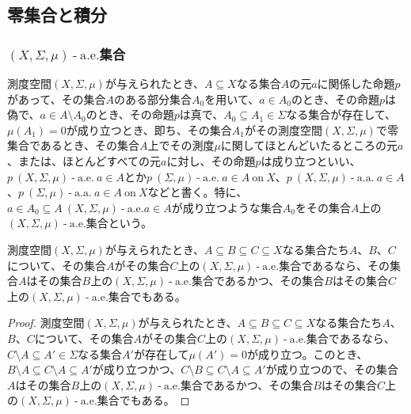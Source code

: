 \documentclass[dvipdfmx]{jsarticle}
\begin{document}
\subsection{零集合と積分}%
\subsubsection{$(X,\varSigma,\mu) \ \text{-} \ \mathrm{a.e.}$集合}%
\begin{dfn*}
測度空間$(X,\varSigma,\mu)$が与えられたとき、$A \subseteq X$なる集合$A$の元$a$に関係した命題$p$があって、その集合$A$のある部分集合$A_{0}$を用いて、$a \in A_{0}$のとき、その命題$p$は偽で、$a \in A \setminus A_{0}$のとき、その命題$p$は真で、$A_{0} \subseteq A_{1} \in \varSigma$なる集合が存在して、$\mu\left( A_{1} \right) = 0$が成り立つとき、即ち、その集合$A_{1}$がその測度空間$(X,\varSigma,\mu)$で零集合であるとき、その集合$A$上でその測度$\mu$に関してほとんどいたるところの元$a$、または、ほとんどすべての元$a$に対し、その命題$p$は成り立つといい、$p\ (X,\varSigma,\mu) \ \text{-} \ \mathrm{a.e.}\ a \in A$とか$p\ (\varSigma,\mu) \ \text{-} \ \mathrm{a.e.}\ a \in A\ \mathrm{on}\ X$、$p\ (X,\varSigma,\mu) \ \text{-} \ \mathrm{a.a.}\ a \in A$、$p\ (\varSigma,\mu) \ \text{-} \ \mathrm{a.a.}\ a \in A\ \mathrm{on}\ X$などと書く。特に、$a \in A_{0} \subseteq A\ (X,\varSigma,\mu) \ \text{-} \ \mathrm{a.e.}a \in A$が成り立つような集合$A_{0}$をその集合$A$上の$(X,\varSigma,\mu) \ \text{-} \ \mathrm{a.e.}$集合という。
\end{dfn*}
\begin{thm}\label{4.6.3.1}
測度空間$(X,\varSigma,\mu)$が与えられたとき、$A \subseteq B \subseteq C \subseteq X$なる集合たち$A$、$B$、$C$について、その集合$A$がその集合$C$上の$(X,\varSigma,\mu) \ \text{-} \ \mathrm{a.e.}$集合であるなら、その集合$A$はその集合$B$上の$(X,\varSigma,\mu) \ \text{-} \ \mathrm{a.e.}$集合であるかつ、その集合$B$はその集合$C$上の$(X,\varSigma,\mu) \ \text{-} \ \mathrm{a.e.}$集合でもある。
\end{thm}
\begin{proof}
測度空間$(X,\varSigma,\mu)$が与えられたとき、$A \subseteq B \subseteq C \subseteq X$なる集合たち$A$、$B$、$C$について、その集合$A$がその集合$C$上の$(X,\varSigma,\mu) \ \text{-} \ \mathrm{a.e.}$集合であるなら、$C \setminus A \subseteq A' \in \varSigma$なる集合$A'$が存在して$\mu\left( A' \right) = 0$が成り立つ。このとき、$B \setminus A \subseteq C \setminus A \subseteq A'$が成り立つかつ、$C \setminus B \subseteq C \setminus A \subseteq A'$が成り立つので、その集合$A$はその集合$B$上の$(X,\varSigma,\mu) \ \text{-} \ \mathrm{a.e.}$集合であるかつ、その集合$B$はその集合$C$上の$(X,\varSigma,\mu) \ \text{-} \ \mathrm{a.e.}$集合でもある。
\end{proof}
\end{document}
